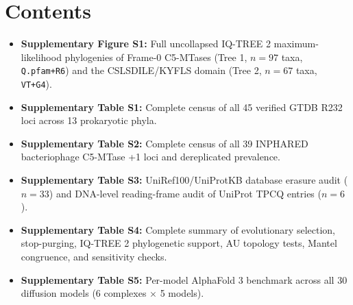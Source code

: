\documentclass[10pt,letterpaper]{article}
\begin{document}
\vspace{4pt}
\vspace{3pt}
\noindent{\color{RuleGray}\rule{\textwidth}{0.7pt}}

\section*{Contents}
\begin{itemize}
  \item \textbf{Supplementary Figure S1:} Full uncollapsed IQ-TREE 2 maximum-likelihood phylogenies of Frame-0 C5-MTases (Tree 1, $n=97$ taxa, \texttt{Q.pfam+R6}) and the CSLSDILE/KYFLS domain (Tree 2, $n=67$ taxa, \texttt{VT+G4}).
  \item \textbf{Supplementary Table S1:} Complete census of all 45 verified GTDB R232 loci across 13 prokaryotic phyla.
  \item \textbf{Supplementary Table S2:} Complete census of all 39 INPHARED bacteriophage C5-MTase +1 loci and dereplicated prevalence.
  \item \textbf{Supplementary Table S3:} UniRef100/UniProtKB database erasure audit ($n=33$) and DNA-level reading-frame audit of UniProt TPCQ entries ($n=6$).
  \item \textbf{Supplementary Table S4:} Complete summary of evolutionary selection, stop-purging, IQ-TREE 2 phylogenetic support, AU topology tests, Mantel congruence, and sensitivity checks.
  \item \textbf{Supplementary Table S5:} Per-model AlphaFold 3 benchmark across all 30 diffusion models (6 complexes $\times$ 5 models).
\end{itemize}

\newpage
\end{document}
